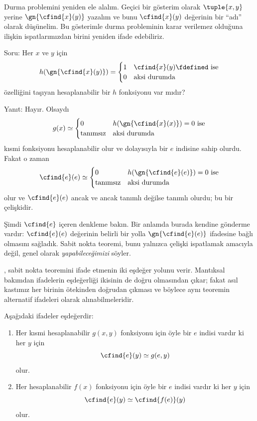 


Durma problemini yeniden ele alalım. Geçici bir gösterim olarak
$\tuple{x,y}$ yerine $\gn{\cfind{x}(y)}$ yazalım ve bunu
$\cfind{x}(y)$ değerinin bir ``adı'' olarak düşünelim. Bu gösterimle durma
probleminin karar verilemez olduğuna ilişkin ispatlarımızdan birini yeniden
ifade edebiliriz.

Soru: Her $x$ ve $y$ için
\[
  h(\gn{\cfind{x}(y)})=\begin{cases}
    1 & \text{$\cfind{x}(y)\fdefined$ ise}\\
    0 & \text{aksi durumda}
  \end{cases}
\]
özelliğini taşıyan hesaplanabilir bir $h$ fonksiyonu var mıdır?

Yanıt: Hayır. Olsaydı
\[
  g(x)\simeq\begin{cases}
    0 & \text{$h(\gn{\cfind{x}(x)})=0$ ise}\\
    \text{tanımsız} & \text{aksi durumda}
  \end{cases}
\]
kısmi fonksiyonu hesaplanabilir olur ve dolayısıyla bir $e$ indisine sahip
olurdu. Fakat o zaman
\[
  \cfind{e}(e)\simeq\begin{cases}
    0 & \text{$h(\gn{\cfind{e}(e)})=0$ ise}\\
    \text{tanımsız} & \text{aksi durumda}
  \end{cases}
\]
olur ve $\cfind{e}(e)$ ancak ve ancak tanımlı değilse tanımlı olurdu; bu bir
çelişkidir.

Şimdi $\cfind{e}$ içeren denkleme bakın. Bir anlamda burada kendine gönderme
vardır: $\cfind{e}(e)$ değerinin belirli bir yolla
$\gn{\cfind{e}(e)}$ ifadesine bağlı olmasını sağladık. Sabit nokta teoremi,
bunu yalnızca çelişki ispatlamak amacıyla değil, genel olarak
\emph{yapabileceğimizi} söyler.

, sabit nokta teoremini ifade etmenin iki eşdeğer
yolunu verir. Mantıksal bakımdan ifadelerin eşdeğerliği ikisinin de doğru
olmasından çıkar; fakat asıl kastımız her birinin ötekinden doğrudan çıkması
ve böylece aynı teoremin alternatif ifadeleri olarak alınabilmeleridir.

\begin{lem}
Aşağıdaki ifadeler eşdeğerdir:
\begin{enumerate}
\item Her kısmi hesaplanabilir $g(x,y)$ fonksiyonu için öyle bir $e$ indisi
  vardır ki her $y$ için
  \[
    \cfind{e}(y)\simeq g(e,y)
  \]
  olur.
\item Her hesaplanabilir $f(x)$ fonksiyonu için öyle bir $e$ indisi vardır
  ki her $y$ için
  \[
    \cfind{e}(y)\simeq\cfind{f(e)}(y)
  \]
  olur.
\end{enumerate}
\end{lem}

